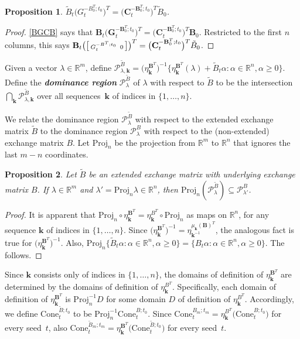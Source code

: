 \documentclass{amsart}
\newtheorem{proposition}{Proposition}[section]
\theoremstyle{definition}
\theoremstyle{remark}
\numberwithin{equation}{section}
\newcommand{\newword}[1]{\textbf{\emph{#1}}}
\newcommand{\reals}{\mathbb R}
\newcommand{\set}[1]{{\lbrace #1 \rbrace}}
\newcommand{\sett}[1]{{\bigl\lbrace #1 \bigr\rbrace}}
\newcommand{\GG}{{\mathbf G}}
\newcommand{\CC}{{\mathbf C}}
\newcommand{\0}{{\mathbf{0}}}
\newcommand{\Cone}{\mathrm{Cone}}
\newcommand{\Proj}{\mathrm{Proj}}
\newcommand{\kk}{\mathbf{k}}
\newcommand{\tB}{{\tilde{B}}}
\newcommand{\BB}{\mathbf{B}}
\renewcommand{\P}{\mathcal{P}}
\begin{document}
\begin{proposition}\label{BGCB ext}
$\tB_t\bigl(G_t^{-B_0^T;t_0}\bigr)^T=\bigl(\CC_t^{-\BB_0^T;t_0}\bigr)^T\tB_0$.
\end{proposition}
\begin{proof}
\cref{BGCB} says that $\BB_t\bigl(\GG_t^{-\BB_0^T;t_0}\bigr)^T=\bigl(\CC_t^{-\BB_0^T;t_0}\bigr)^T\BB_0$.
Restricted to the first $n$ columns, this says $\BB_t\bigl(\begin{bsmallmatrix}G_t^{-B^T;t_0}&\,0\end{bsmallmatrix}\bigr)^T=\bigl(\CC_t^{-\BB_0^T;t_0}\bigr)^T\tB_0$.
\end{proof}

Given a vector $\lambda\in\reals^m$, define $\P^\tB_{\lambda,\kk}=\bigl(\eta_{\kk}^{\BB^T}\bigr)^{-1}\sett{\eta_\kk^{\BB^T}(\lambda)+\tB_t\alpha:\alpha\in\reals^n,\alpha\ge0}$.
Define the \newword{dominance region} $\P^\tB_\lambda$ of $\lambda$ with respect to $\tB$ to be the intersection $\bigcap_\kk\P^\tB_{\lambda,\kk}$ over all sequences~$\kk$ of indices in $\set{1,\ldots,n}$.

We relate the dominance region $\P_\lambda^\tB$ with respect to the extended exchange matrix $\tB$ to the dominance region $\P_\lambda^B$ with respect to the (non-extended) exchange matrix $B$.
Let $\Proj_n$ be the projection from $\reals^m$ to $\reals^n$ that ignores the last $m-n$ coordinates.

\begin{proposition}\label{contains proj}
Let $\tB$ be an extended exchange matrix with underlying exchange matrix $B$.
If $\lambda\in\reals^m$ and $\lambda'=\Proj_n\lambda\in\reals^n$, then $\Proj_n(\P_\lambda^\tB)\subseteq\P_{\lambda'}^B$.
\end{proposition}
\begin{proof}
It is apparent that $\Proj_n\circ\eta_\kk^{\BB^T}=\eta_\kk^{B^T}\circ\Proj_n$ as maps on $\reals^n$, for any sequence $\kk$ of indices in $\set{1,\ldots,n}$.
Since $\bigl(\eta_\kk^{\BB^T}\bigr)^{-1}=\eta_{\kk^{-1}}^{\mu_\kk(\BB)^T}$, the analogous fact is true for $\bigl(\eta_\kk^{\BB^T}\bigr)^{-1}$.
Also, $\Proj_n\set{\tB_t\alpha:\alpha\in\reals^n,\alpha\ge0}=\set{B_t\alpha:\alpha\in\reals^n,\alpha\ge0}$.
The  follows.
\end{proof}

Since $\kk$ consists only of indices in $\set{1,\ldots,n}$, the domains of definition of $\eta_\kk^{\BB^T}$ are determined by the domains of definition of $\eta_\kk^{B^T}$.
Specifically, each domain of definition of $\eta_\kk^{\BB^T}$ is $\Proj_n^{-1}D$ for some domain $D$ of definition of $\eta_\kk^{B^T}$.
Accordingly, we define $\Cone_t^{\tB;t_0}$ to be %
$\Proj_n^{-1}\Cone_t^{B;t_0}$.
Since $\Cone_t^{B_m;t_m}=\eta_\kk^{B^T}\bigl(\Cone_t^{B;t_0}\bigr)$ for every seed~$t$, also $\Cone_t^{\tB_m;t_m}=\eta_\kk^{\BB^T}\bigl(\Cone_t^{\tB;t_0}\bigr)$ for every seed~$t$.
\end{document}
